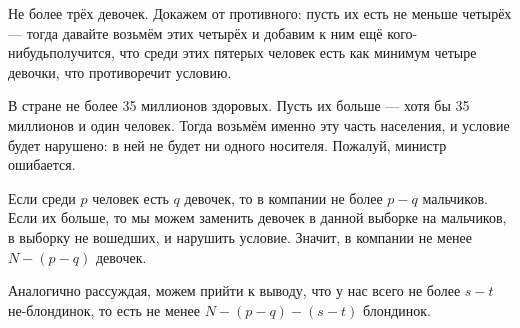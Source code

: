 \begin{itemize}
\itA Не более трёх девочек. Докажем от противного: пусть их есть не меньше четырёх --- 
тогда давайте возьмём этих четырёх и добавим к ним ещё кого-нибудь\scolon получится, что  
среди этих пятерых человек есть как минимум четыре девочки, что противоречит условию.

\itB В стране не более 35 миллионов здоровых. Пусть их больше --- хотя бы 35 миллионов и один 
человек. Тогда возьмём именно эту часть населения, и условие будет нарушено: в ней
не будет ни одного носителя. Пожалуй, министр ошибается.

\itC Если среди $p$ человек есть $q$ девочек, то в компании не более $p-q$ мальчиков. 
Если их больше, то мы можем заменить девочек в данной выборке на мальчиков, в выборку
не вошедших, и нарушить условие. Значит, в компании не менее $N-(p-q)$ девочек.

Аналогично рассуждая, можем прийти к выводу, что у нас всего не более $s-t$ не-блондинок, 
то есть не менее $N-(p-q)-(s-t)$ блондинок.
\end{itemize}
